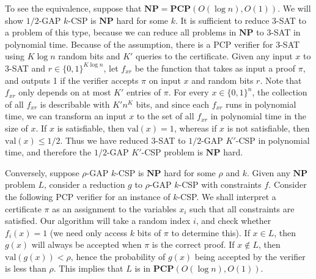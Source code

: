 To see the equivalence, suppose that $\mathbf{NP} = \mathbf{PCP}(O(\log n), O(1))$. We will show $1/2$-GAP $k$-CSP is $\mathbf{NP}$ hard for some $k$. It is sufficient to reduce $3$-SAT to a problem of this type, because we can reduce all problems in $\mathbf{NP}$ to 3-SAT in polynomial time. Because of the assumption, there is a PCP verifier for 3-SAT using $K \log n$ random bits and $K'$ queries to the certificate. Given any input $x$ to 3-SAT and $r \in \{ 0, 1 \}^{K \log n}$, let $f_{xr}$ be the function that takes as input a proof $\pi$, and outputs 1 if the verifier accepts $\pi$ on input $x$ and random bits $r$. Note that $f_{xr}$ only depends on at most $K'$ entries of $\pi$. For every $x \in \{ 0, 1 \}^n$, the collection of all $f_{xr}$ is describable with $K' n^K$ bits, and since each $f_{xr}$ runs in polynomial time, we can transform an input $x$ to the set of all $f_{xr}$ in polynomial time in the size of $x$. If $x$ is satisfiable, then $\text{val}(x) = 1$, whereas if $x$ is not satisfiable, then $\text{val}(x) \leq 1/2$. Thus we have reduced 3-SAT to $1/2$-GAP $K'$-CSP in polynomial time, and therefore the $1/2$-GAP $K'$-CSP problem is $\mathbf{NP}$ hard.

Conversely, suppose $\rho$-GAP $k$-CSP is $\mathbf{NP}$ hard for some $\rho$ and $k$. Given any $\mathbf{NP}$ problem $L$, consider a reduction $g$ to $\rho$-GAP $k$-CSP with constraints $f$. Consider the following PCP verifier for an instance of $k$-CSP. We shall interpret a certificate $\pi$ as an assignment to the variables $x_i$ such that all constraints are satisfied. Our algorithm will take a random index $i$, and check whether $f_i(x) = 1$ (we need only access $k$ bits of $\pi$ to determine this). If $x \in L$, then $g(x)$ will always be accepted when $\pi$ is the correct proof. If $x \not \in L$, then $\text{val}(g(x)) < \rho$, hence the probability of $g(x)$ being accepted by the verifier is less than $\rho$. This implies that $L$ is in $\mathbf{PCP}(O(\log n), O(1))$.

